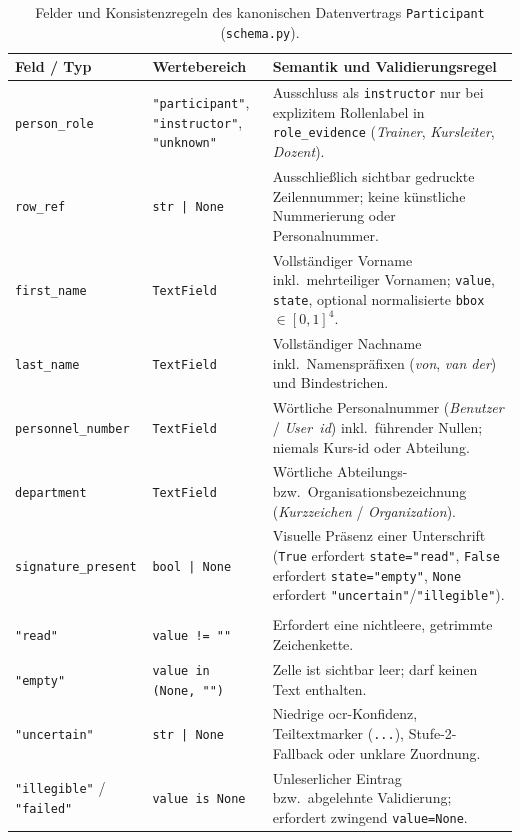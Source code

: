 \begin{table}[htbp]
  \centering
  \caption[Felder und Konsistenzregeln des Datenvertrags Participant]{Felder und Konsistenzregeln des kanonischen Datenvertrags \texttt{Participant} (\texttt{schema.py}).}
  \label{tab:anhang-schema}
  \footnotesize
  \begin{tabularx}{\textwidth}{@{}>{\raggedright\arraybackslash}p{} >{\raggedright\arraybackslash}p{} >{\raggedright\arraybackslash}X@{}}
    \toprule
    \textbf{Feld / Typ} & \textbf{Wertebereich} & \textbf{Semantik und Validierungsregel} \\
    \midrule
    \texttt{person\_role} & \texttt{"participant"}, \texttt{"instructor"}, \texttt{"unknown"} & Ausschluss als \texttt{instructor} nur bei explizitem Rollenlabel in \texttt{role\_evidence} (\emph{Trainer}, \emph{Kursleiter}, \emph{Dozent}). \\
    \addlinespace[2pt]
    \texttt{row\_ref} & \texttt{str | None} & Ausschließlich sichtbar gedruckte Zeilennummer; keine künstliche Nummerierung oder Personalnummer. \\
    \addlinespace[2pt]
    \texttt{first\_name} & \texttt{TextField} & Vollständiger Vorname inkl.\ mehrteiliger Vornamen; \texttt{value}, \texttt{state}, optional normalisierte \texttt{bbox} $\in [0,1]^4$. \\
    \addlinespace[2pt]
    \texttt{last\_name} & \texttt{TextField} & Vollständiger Nachname inkl.\ Namenspräfixen (\emph{von}, \emph{van der}) und Bindestrichen. \\
    \addlinespace[2pt]
    \texttt{personnel\_number} & \texttt{TextField} & Wörtliche Personalnummer (\emph{Benutzer} / \emph{User~\ac{id}}) inkl.\ führender Nullen; niemals Kurs-\ac{id} oder Abteilung. \\
    \addlinespace[2pt]
    \texttt{department} & \texttt{TextField} & Wörtliche Abteilungs- bzw.\ Organisationsbezeichnung (\emph{Kurzzeichen} / \emph{Organization}). \\
    \addlinespace[2pt]
    \texttt{signature\_present} & \texttt{bool | None} & Visuelle Präsenz einer Unterschrift (\texttt{True} erfordert \texttt{state="read"}, \texttt{False} erfordert \texttt{state="empty"}, \texttt{None} erfordert \texttt{"uncertain"}/\texttt{"illegible"}). \\
    \midrule
    \multicolumn{3}{@{}l}{\textit{Zulässige Feldzustände (\texttt{State}):}} \\
    \texttt{"read"} & \texttt{value != ""} & Erfordert eine nichtleere, getrimmte Zeichenkette. \\
    \texttt{"empty"} & \texttt{value in (None, "")} & Zelle ist sichtbar leer; darf keinen Text enthalten. \\
    \texttt{"uncertain"} & \texttt{str | None} & Niedrige \ac{ocr}-Konfidenz, Teiltextmarker (\texttt{...}), Stufe-2-Fallback oder unklare Zuordnung. \\
    \texttt{"illegible"} / \texttt{"failed"} & \texttt{value is None} & Unleserlicher Eintrag bzw.\ abgelehnte Validierung; erfordert zwingend \texttt{value=None}. \\
    \bottomrule
  \end{tabularx}
\end{table}

